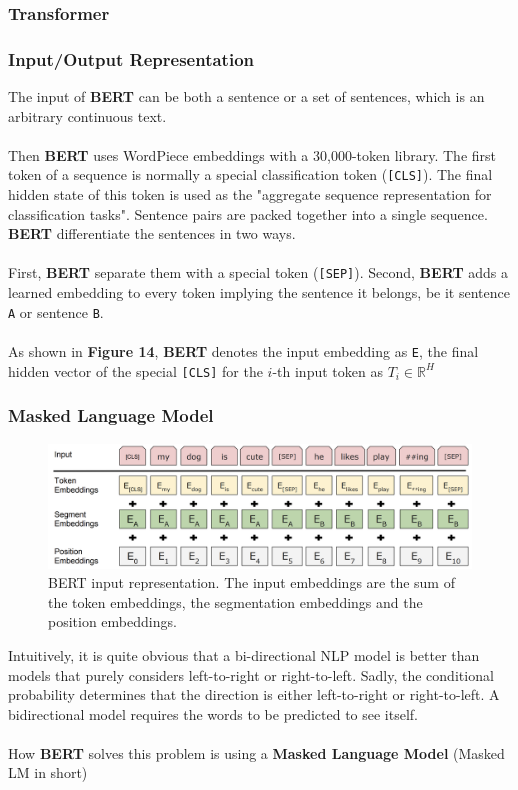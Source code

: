 \documentclass[paper=a4, fontsize=12pt]{scrartcl}
\begin{document}
\subsubsection{Transformer}
\subsubsection{Input/Output Representation}
The input of \textbf{BERT} can be both a sentence or a set of sentences, which is an arbitrary continuous text. \\\\
Then \textbf{BERT} uses WordPiece embeddings with a 30,000-token library. The first token of a sequence is normally a special classification token (\texttt{[CLS]}). The final hidden state of this token is used as the "aggregate sequence representation for classification tasks". Sentence pairs are packed together into a single sequence. \textbf{BERT} differentiate the sentences in two ways. \\\\
 First, \textbf{BERT} separate them with a special token (\texttt{[SEP]}). Second, \textbf{BERT} adds a learned embedding to every token implying the sentence it belongs, be it sentence \texttt{A} or sentence \texttt{B}. \\\\
As shown in \textbf{Figure 14}, \textbf{BERT} denotes the input embedding as \texttt{E}, the final hidden vector of the special \texttt{[CLS]} for the $i$-th input token as $T_i \in \mathbb{R}^H$
\subsubsection{Masked Language Model}
 \begin{figure}
  \includegraphics[scale=0.53]{bertinput.png}
  \caption{BERT input representation. The input embeddings are the sum of the token embeddings, the segmentation embeddings and the position embeddings.}
  \label{fig:skip-gram}
\end{figure}
Intuitively,  it is quite obvious that a bi-directional NLP model is better than models that purely considers left-to-right or right-to-left. Sadly, the conditional probability determines that the direction is either left-to-right or right-to-left. A bidirectional model requires the words to be predicted to see itself. \\\\
How \textbf{BERT} solves this problem is using a \textbf{Masked Language Model} (Masked LM in short)
\end{document}
